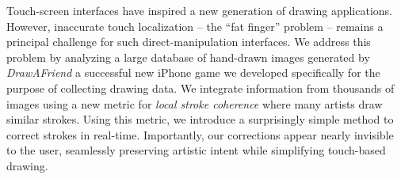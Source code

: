 Touch-screen interfaces have inspired a new generation of drawing
applications. However, inaccurate touch localization -- the ``fat
finger'' problem -- remains a principal challenge for such
direct-manipulation interfaces. We address this problem by analyzing
a large database of hand-drawn images generated by
\emph{DrawAFriend} a successful new iPhone game we developed
specifically for the purpose of collecting drawing data. We
integrate information from thousands of images using a new metric
for \emph{local stroke coherence} where many artists draw similar
strokes. Using this metric, we introduce a surprisingly simple
method to correct strokes in real-time. Importantly, our corrections
appear nearly invisible to the user, seamlessly preserving artistic
intent while simplifying touch-based drawing.
